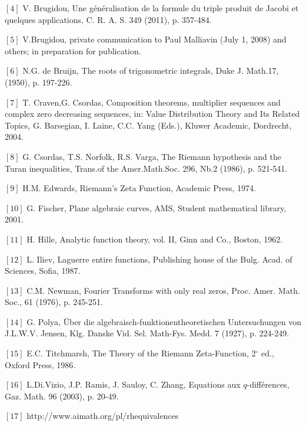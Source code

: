 \documentclass{article}
\begin{document}
$\left[ 4\right] $ V. Brugidou, Une g\'{e}n\'{e}ralisation de la formule du
triple produit de Jacobi et quelques applications, C. R. A. S. 349 (2011),
p. 357-484.

$\left[ 5\right] $ V.Brugidou, private communication to Paul
Malliavin (July 1, 2008) and others; in preparation for publication.

$\left[ 6\right] $ N.G. de Bruijn, The roots of trigonometric integrals,
Duke J. Math.17, (1950), p. 197-226.

$\left[ 7\right] $ T. Craven,G. Csordas, Composition theorems, multiplier
sequences and complex zero decreasing sequences, in: Value Distribution
Theory and Its Related Topics, G. Barsegian, I. Laine, C.C. Yang (Eds.),
Kluwer Academic, Dordrecht, 2004.

$\left[ 8\right] $ G. Csordas, T.S. Norfolk, R.S. Varga, The Riemann
hypothesis and the Turan inequalities, Trans.of the Amer.Math.Soc. 296, Nb.2
(1986), p. 521-541.

$\left[ 9\right] $ H.M. Edwards, Riemann's Zeta Function, Academic Press,
1974.

$\left[ 10\right] $ G. Fischer, Plane algebraic curves, AMS, Student
mathematical library, 2001.

$\left[ 11\right] $ H. Hille, Analytic function theory, vol. II, Ginn and
Co., Boston, 1962.

$\left[ 12\right] $ L. Iliev, Laguerre entire functions, Publishing house of
the Bulg. Acad. of Sciences, Sofia, 1987.

$\left[ 13\right] $ C.M. Newman, Fourier Transforms with only real zeros,
Proc. Amer. Math. Soc., 61 (1976), p. 245-251.

$\left[ 14\right] $ G. Polya, \"{U}ber die
algebraisch-funktionentheoretischen Untersuchungen von J.L.W.V. Jensen, Klg.
Danske Vid. Sel. Math-Fys. Medd. 7 (1927), p. 224-249.

$\left[ 15\right] $ E.C. Titchmarsh, The Theory of the Riemann
Zeta-Function, 2${{}^\circ}$ ed., Oxford Press, 1986.

$\left[ 16\right] $ L.Di.Vizio, J.P. Ramis, J. Sauloy, C. Zhang, Equations
aux $q$-diff\'{e}rences, Gaz. Math. 96 (2003), p. 20-49.

$\left[ 17\right] $ http://www.aimath.org/pl/rhequivalences
\end{document}
